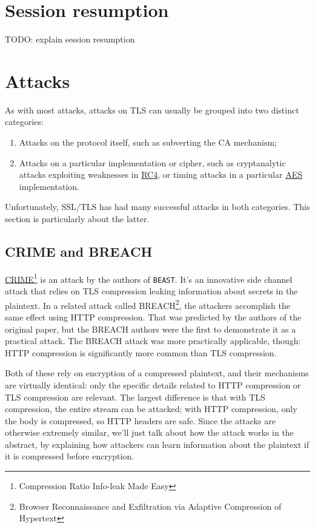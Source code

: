 \documentclass[11pt,ebook,table,dvipsnames]{memoir}
\begin{document}
\section{Session resumption}
\label{sec-3-1-7}

TODO: explain session resumption
\section{Attacks}
\label{sec-3-1-8}

As with most attacks, attacks on TLS can usually be grouped into two
distinct categories:

\begin{enumerate}
\item Attacks on the protocol itself, such as subverting the CA mechanism;
\item Attacks on a particular implementation or cipher, such as
cryptanalytic attacks exploiting weaknesses in \hyperref[RC4]{RC4}, or timing
attacks in a particular \hyperref[AES]{AES} implementation.
\end{enumerate}

Unfortunately, SSL/TLS has had many successful attacks in both
categories. This section is particularly about the latter.

\subsection{\label{CRIME}CRIME and BREACH}
\label{sec-3-1-8-1}

\hyperref[CRIME]{CRIME}\footnote{Compression Ratio Info-leak Made Easy} is an attack by the
authors of \texttt{BEAST}. It's an innovative side channel attack that relies
on TLS compression leaking information about secrets in the plaintext.
In a related attack called BREACH\footnote{Browser Reconnaissance and
Exfiltration via Adaptive Compression of Hypertext}, the attackers
accomplish the same effect using HTTP compression. That was predicted
by the authors of the original paper, but the BREACH authors were the
first to demonstrate it as a practical attack. The BREACH attack was
more practically applicable, though: HTTP compression is
significantly more common than TLS compression.

Both of these rely on encryption of a compressed plaintext, and their
mechanisms are virtually identical: only the specific details related
to HTTP compression or TLS compression are relevant. The largest
difference is that with TLS compression, the entire stream can be
attacked; with HTTP compression, only the body is compressed, so HTTP
headers are safe. Since the attacks are otherwise extremely similar,
we'll just talk about how the attack works in the abstract, by
explaining how attackers can learn information about the plaintext if
it is compressed before encryption.
\end{document}
